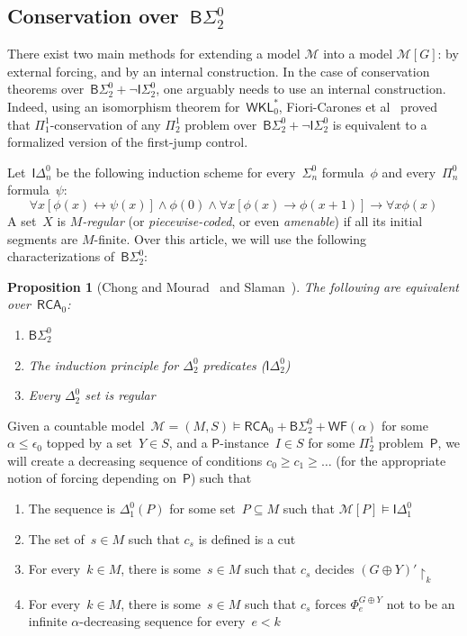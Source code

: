 \documentclass{article}
\numberwithin{theorem}{section}
\newtheorem{proposition}[theorem]{Proposition}
\newcommand{\RCA}{\mathsf{RCA}}
\newcommand{\WKL}{\mathsf{WKL}}
\newcommand{\BSig}{\mathsf{B}\Sigma^0}
\newcommand{\ISig}{\mathsf{I}\Sigma^0}
\newcommand{\IDel}{\mathsf{I}\Delta^0}
\newcommand{\WF}{\mathsf{WF}}
\newcommand{\M}{\mathcal{M}}
\newcommand{\uh}[0]{{\upharpoonright}}
\begin{document}
\subsection{Conservation over~$\BSig_2$}

There exist two main methods for extending a model $\M$ into a model $\M[G]$: by external forcing, and by an internal construction. In the case of conservation theorems over~$\BSig_2 + \neg \ISig_2$, one arguably needs to use an internal construction. Indeed, using an isomorphism theorem for~$\WKL^*_0$, Fiori-Carones et al~\cite{fiori2021isomorphism} proved that $\Pi^1_1$-conservation of any $\Pi^1_2$ problem over~$\BSig_2 + \neg \ISig_2$ is equivalent to a formalized version of the first-jump control.

Let~$\IDel_n$ be the following induction scheme for every~$\Sigma^0_n$ formula~$\phi$ and every~$\Pi^0_n$ formula~$\psi$:
$$
\forall x[\phi(x) \leftrightarrow \psi(x)] \wedge \phi(0) \wedge \forall x[\phi(x) \rightarrow \phi(x+1)] \rightarrow \forall x \phi(x)
$$
A set~$X$ is \emph{$M$-regular} (or \emph{piecewise-coded}, or even \emph{amenable}) if all its initial segments are $M$-finite.
Over this article, we will use the following characterizations of~$\BSig_2$:

\begin{proposition}[Chong and Mourad~\cite{chong1990degree} and Slaman~\cite{slaman2004bounding}]
The following are equivalent over~$\RCA_0$:
\begin{enumerate}
    \item[(1)] $\BSig_2$
    \item[(2)] The induction principle for $\Delta^0_2$ predicates ($\IDel_2$)
    \item[(3)] Every $\Delta^0_2$ set is regular
\end{enumerate}
\end{proposition}

Given a countable model~$\M = (M, S) \models \RCA_0 + \BSig_2 + \WF(\alpha)$ for some~$\alpha \leq \epsilon_0$ topped by a set~$Y \in S$, and a $\mathsf{P}$-instance~$I \in S$ for some $\Pi^1_2$ problem~$\mathsf{P}$, we will create a decreasing sequence of conditions $c_0 \geq c_1 \geq \dots$ (for the appropriate notion of forcing depending on~$\mathsf{P}$) such that
\begin{enumerate}
    \item[(a)] The sequence is $\Delta^0_1(P)$ for some set~$P \subseteq M$ such that $\M[P] \models \IDel_1$
    \item[(b)] The set of~$s \in M$ such that $c_s$ is defined is a cut
    \item[(c)] For every~$k \in M$, there is some~$s \in M$ such that $c_s$ decides $(G \oplus Y)' \uh_k$
    \item[(d)] For every~$k \in M$, there is some~$s \in M$ such that $c_s$ forces $\Phi_e^{G \oplus Y}$ not to be an infinite $\alpha$-decreasing sequence for every~$e < k$
\end{enumerate}
\end{document}
